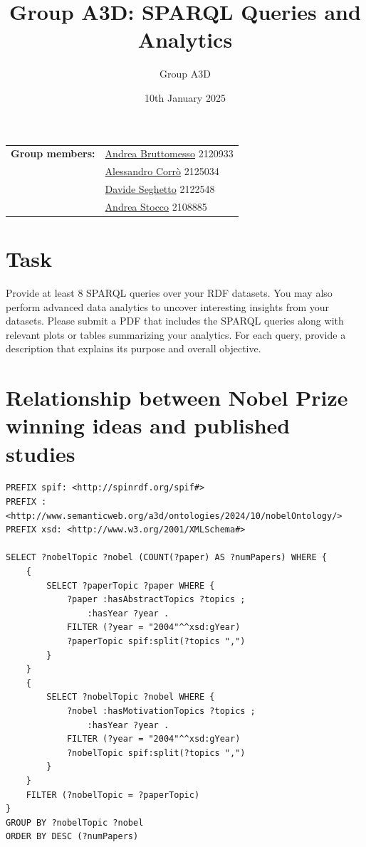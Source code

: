 \documentclass{article}
\title{Group A3D: SPARQL Queries and Analytics}
\author{Group A3D}
\date{10th January 2025}
\begin{document}
\maketitle

\begin{tabular}{@{}ll}
	\textbf{Group members:}
	 & \href{mailto:andrea.bruttomesso.1@studenti.unipd.it}{Andrea Bruttomesso} 2120933 \\
	 & \href{mailto:alessandro.corro.1@studenti.unipd.it}{Alessandro Corr\`o} 2125034   \\
	 & \href{mailto:davide.seghetto@studenti.unipd.it}{Davide Seghetto} 2122548         \\
	 & \href{mailto:andrea.stocco.8@studenti.unipd.it}{Andrea Stocco} 2108885           \\
\end{tabular}


\section*{Task}
Provide at least 8 SPARQL queries over your RDF datasets. You may also perform advanced data analytics to uncover interesting insights from your datasets.
Please submit a PDF that includes the SPARQL queries along with relevant plots or tables summarizing your analytics.
For each query, provide a description that explains its purpose and overall objective.

\section{Relationship between Nobel Prize winning ideas and published studies}
\begin{lstlisting}
PREFIX spif: <http://spinrdf.org/spif#>
PREFIX : <http://www.semanticweb.org/a3d/ontologies/2024/10/nobelOntology/>
PREFIX xsd: <http://www.w3.org/2001/XMLSchema#>

SELECT ?nobelTopic ?nobel (COUNT(?paper) AS ?numPapers) WHERE {
    {
        SELECT ?paperTopic ?paper WHERE {
            ?paper :hasAbstractTopics ?topics ;
               	:hasYear ?year .
            FILTER (?year = "2004"^^xsd:gYear)
            ?paperTopic spif:split(?topics ",")
        }
    }
    {
        SELECT ?nobelTopic ?nobel WHERE {
            ?nobel :hasMotivationTopics ?topics ;
                :hasYear ?year .
            FILTER (?year = "2004"^^xsd:gYear)
            ?nobelTopic spif:split(?topics ",")
        }
    }
    FILTER (?nobelTopic = ?paperTopic)
}
GROUP BY ?nobelTopic ?nobel
ORDER BY DESC (?numPapers)
\end{lstlisting}
\end{document}
